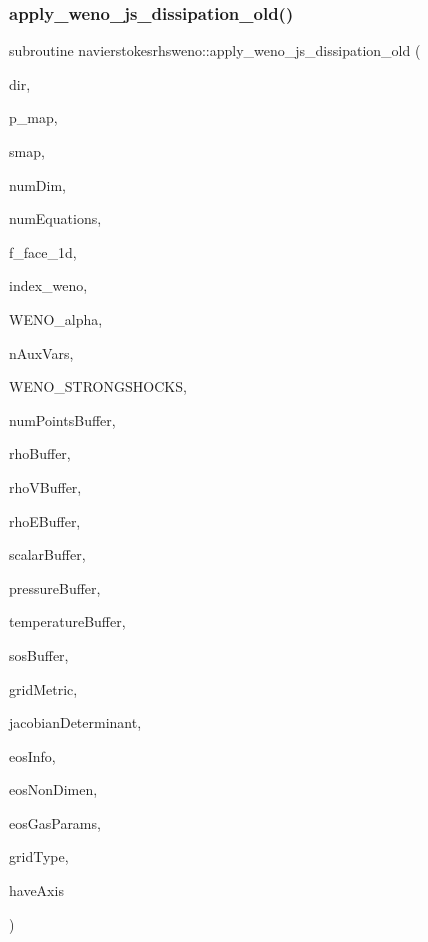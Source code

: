 \subsubsection{\texorpdfstring{apply\+\_\+weno\+\_\+js\+\_\+dissipation\+\_\+old()}{apply\_weno\_js\_dissipation\_old()}}
{\footnotesize\ttfamily subroutine navierstokesrhsweno\+::apply\+\_\+weno\+\_\+js\+\_\+dissipation\+\_\+old (\begin{DoxyParamCaption}\item[{integer(kind=4), intent(in)}]{dir,  }\item[{integer(kind=8), dimension(\+:)}]{p\+\_\+map,  }\item[{real(kind=8), dimension(\+:,\+:), intent(in)}]{smap,  }\item[{integer(kind=4), intent(in)}]{num\+Dim,  }\item[{integer(kind=4), intent(in)}]{num\+Equations,  }\item[{real(kind=8), dimension(\+:,\+:), intent(out)}]{f\+\_\+face\+\_\+1d,  }\item[{integer(kind=8), dimension(2)}]{index\+\_\+weno,  }\item[{real(kind=8)}]{W\+E\+N\+O\+\_\+alpha,  }\item[{integer(kind=4), intent(in)}]{n\+Aux\+Vars,  }\item[{integer(kind=4)}]{W\+E\+N\+O\+\_\+\+S\+T\+R\+O\+N\+G\+S\+H\+O\+C\+KS,  }\item[{integer(kind=8)}]{num\+Points\+Buffer,  }\item[{real(kind=8), dimension(numpointsbuffer), intent(in)}]{rho\+Buffer,  }\item[{real(kind=8), dimension(numdim$\ast$numpointsbuffer), intent(in), target}]{rho\+V\+Buffer,  }\item[{real(kind=8), dimension(numpointsbuffer), intent(in)}]{rho\+E\+Buffer,  }\item[{real(kind=8), dimension(nauxvars$\ast$numpointsbuffer), intent(in), target}]{scalar\+Buffer,  }\item[{real(kind=8), dimension(numpointsbuffer), intent(in)}]{pressure\+Buffer,  }\item[{real(kind=8), dimension(numpointsbuffer), intent(in)}]{temperature\+Buffer,  }\item[{real(kind=8), dimension(numpointsbuffer), intent(in)}]{sos\+Buffer,  }\item[{real(kind=8), dimension(numdim$\ast$numdim$\ast$numpointsbuffer)}]{grid\+Metric,  }\item[{real(kind=8), dimension(numpointsbuffer)}]{jacobian\+Determinant,  }\item[{integer(kind=8), dimension(numgasinfos)}]{eos\+Info,  }\item[{real(kind=8), dimension(numnondimens), intent(in)}]{eos\+Non\+Dimen,  }\item[{real(kind=8), dimension(numgasparams$\ast$(nauxvars+1)), intent(in)}]{eos\+Gas\+Params,  }\item[{integer(kind=4), intent(in)}]{grid\+Type,  }\item[{integer(kind=4)}]{have\+Axis }\end{DoxyParamCaption})}



